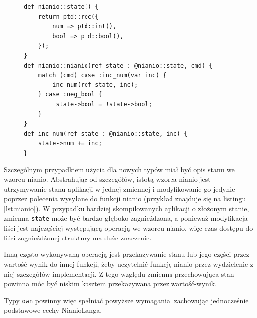 \documentclass[licencjacka]{pracamgr}
\begin{document}
\begin{figure}
\begin{lstlisting}[caption={Przykład funkcji nianio},label={lst:nianio},aboveskip=-15pt]
def nianio::state() {
    return ptd::rec({
        num => ptd::int(),
        bool => ptd::bool(),
    });
}
def nianio::nianio(ref state : @nianio::state, cmd) {
    match (cmd) case :inc_num(var inc) {
        inc_num(ref state, inc);
    } case :neg_bool {
         state->bool = !state->bool;
    }
}
def inc_num(ref state : @nianio::state, inc) {
    state->num += inc;
}
\end{lstlisting}
\end{figure}
Szczególnym przypadkiem użycia dla nowych typów miał być opis stanu we wzorcu nianio.
Abstrahując od szczegółów, istotą wzorca nianio jest utrzymywanie stanu aplikacji w jednej zmiennej
i modyfikowanie go jedynie poprzez polecenia wysyłane do funkcji nianio (przykład znajduje się
na listingu \ref{lst:nianio}). W przypadku bardziej skompilowanych aplikacji o złożonym stanie,
zmienna \texttt{state} może być bardzo głęboko zagnieżdzona, a ponieważ modyfikacja liści jest najczęściej
występującą operacją we wzorcu nianio, więc czas dostępu do liści zagnieżdżonej
struktury ma duże znaczenie.

Inną często wykonywaną operacją jest przekazywanie stanu lub jego części przez wartość-wynik do innej funkcji,
żeby uczytelnić funkcję nianio przez wydzielenie z niej szczegółów implementacji. Z tego względu zmienna
przechowująca stan powinna móc być niskim kosztem przekazywana przez wartość-wynik. 

Typy \texttt{own} powinny więc spełniać powyższe wymagania, zachowując jednocześnie podstawowe cechy NianioLanga.
\end{document}

